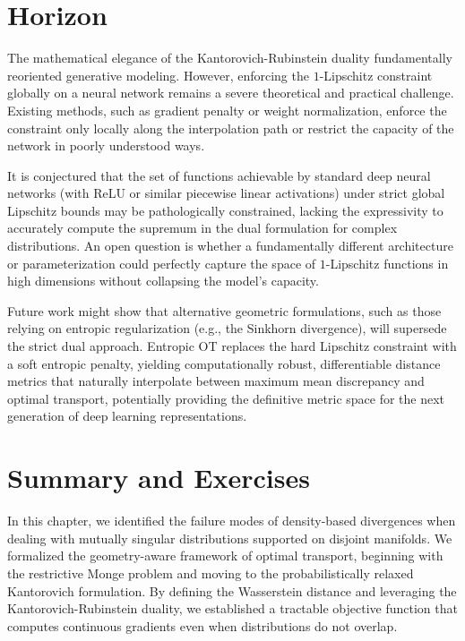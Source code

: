 \section{Horizon}
\begin{horizon}
The mathematical elegance of the Kantorovich-Rubinstein duality fundamentally reoriented generative modeling. However, enforcing the $1$-Lipschitz constraint globally on a neural network remains a severe theoretical and practical challenge. Existing methods, such as gradient penalty or weight normalization, enforce the constraint only locally along the interpolation path or restrict the capacity of the network in poorly understood ways.

It is conjectured that the set of functions achievable by standard deep neural networks (with ReLU or similar piecewise linear activations) under strict global Lipschitz bounds may be pathologically constrained, lacking the expressivity to accurately compute the supremum in the dual formulation for complex distributions. An open question is whether a fundamentally different architecture or parameterization could perfectly capture the space of $1$-Lipschitz functions in high dimensions without collapsing the model's capacity.

Future work might show that alternative geometric formulations, such as those relying on entropic regularization (e.g., the Sinkhorn divergence), will supersede the strict dual approach. Entropic OT replaces the hard Lipschitz constraint with a soft entropic penalty, yielding computationally robust, differentiable distance metrics that naturally interpolate between maximum mean discrepancy and optimal transport, potentially providing the definitive metric space for the next generation of deep learning representations.
\end{horizon}

\section{Summary and Exercises}
In this chapter, we identified the failure modes of density-based divergences when dealing with mutually singular distributions supported on disjoint manifolds. We formalized the geometry-aware framework of optimal transport, beginning with the restrictive Monge problem and moving to the probabilistically relaxed Kantorovich formulation. By defining the Wasserstein distance and leveraging the Kantorovich-Rubinstein duality, we established a tractable objective function that computes continuous gradients even when distributions do not overlap.

